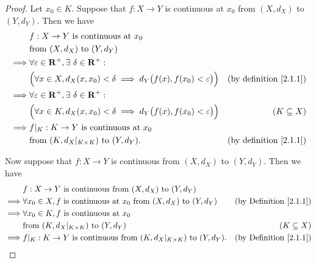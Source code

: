 \begin{proof}
    Let \(x_0 \in K\).
    Suppose that \(f : X \to Y\) is continuous at \(x_0\) from \((X, d_X)\) to \((Y, d_Y)\).
    Then we have
    \begin{align*}
                 & f : X \to Y \text{ is continuous at } x_0                                                                                             \\
                 & \text{from } (X, d_X) \text{ to } (Y, d_Y)                                                                                            \\
        \implies & \forall \varepsilon \in \mathbf{R}^+, \exists\ \delta \in \mathbf{R}^+ :                                                                              \\
                 & \Big(\forall x \in X, d_X(x, x_0) < \delta \implies d_Y\big(f(x), f(x_0) < \varepsilon\big)\Big) & \text{(by definition \ref{2.1.1})} \\
        \implies & \forall \varepsilon \in \mathbf{R}^+, \exists\ \delta \in \mathbf{R}^+ :                                                                              \\
                 & \Big(\forall x \in K, d_X(x, x_0) < \delta \implies d_Y\big(f(x), f(x_0) < \varepsilon\big)\Big) & (K \subseteq X)                    \\
        \implies & f|_K : K \to Y \text{ is continuous at } x_0                                                                                          \\
                 & \text{from } (K, d_X|_{K \times K}) \text{ to } (Y, d_Y).                                        & \text{(by definition \ref{2.1.1})}
    \end{align*}

    Now suppose that \(f : X \to Y\) is continuous from \((X, d_X)\) to \((Y, d_Y)\).
    Then we have
    \begin{align*}
                 & f : X \to Y \text{ is continuous from } (X, d_X) \text{ to } (Y, d_Y)                                                               \\
        \implies & \forall x_0 \in X, f \text{ is continuous at } x_0 \text{ from } (X, d_X) \text{ to } (Y, d_Y) & \text{(by Definition \ref{2.1.1})} \\
        \implies & \forall x_0 \in K, f \text{ is continuous at } x_0                                                                                  \\
                 & \text{from } (K, d_X|_{K \times K}) \text{ to } (Y, d_Y)                                       & (K \subseteq X)                    \\
        \implies & f|_K : K \to Y \text{ is continuous from } (K, d_X|_{K \times K}) \text{ to } (Y, d_Y).        & \text{(by Definition \ref{2.1.1})}
    \end{align*}
\end{proof}

